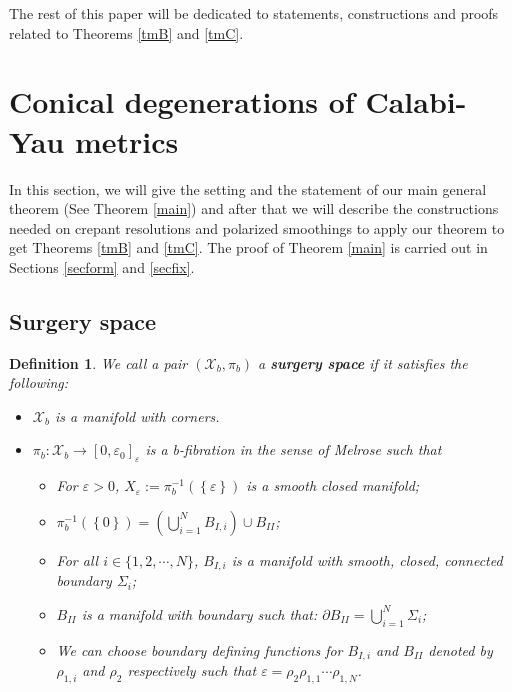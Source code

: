 \documentclass[a4paper,11pt]{article}
\newcounter{mythm}[section]
\newtheorem{defi}[mythm]{Definition}
\begin{document}
 The rest of this paper will be dedicated to statements, constructions and proofs related to Theorems \ref{tmB} and \ref{tmC}. 
 \section{Conical degenerations of Calabi-Yau metrics} \label{set}
 In this section, we will give the setting and the statement of our main general theorem (See Theorem \ref{main}) and after that we will describe the constructions needed on crepant resolutions and polarized smoothings to apply our theorem to get Theorems \ref{tmB} and \ref{tmC}. The proof of Theorem \ref{main} is carried out in Sections \ref{secform} and \ref{secfix}.
\subsection{Surgery space}
\begin{defi} \label{srg}
We call a pair $\left(\mathcal{X}_b, \pi_b \right)$ a \textbf{surgery space} if it satisfies the following: 
\begin{itemize}
    \item $\mathcal{X}_b$ is a manifold with corners.
    \item $\pi_b : \mathcal{X}_b \rightarrow [0, \varepsilon_0]_\varepsilon $ is a b-fibration in the sense of Melrose such that 
    \begin{itemize}
        \item For $\varepsilon >0$, $X_\varepsilon := \pi_b^{-1} (\left\{ \varepsilon \right\})$ is a smooth closed manifold;
        \item $\pi_b^{-1} (\left\{ 0 \right\}) = \left( \bigcup_{i=1}^N B_{I,i} \right) \cup B_{II}$;
        \item For all $i \in \{1,2, \cdots, N \}$, $B_{I,i}$ is a manifold with smooth, closed, connected boundary $\Sigma_i$;
        \item $B_{II}$ is a manifold with boundary such that: $\partial B_{II} = \bigcup_{i=1}^N \Sigma_i$;
        \item We can choose boundary defining functions for $B_{I,i}$ and $B_{II}$ denoted by $\rho_{1,i}$ and $\rho_{2}$ respectively such that $\varepsilon = \rho_2 \rho_{1,1} \cdots \rho_{1,N}$.
    \end{itemize}
\end{itemize}
\end{defi}
\vspace{0.5cm}
\end{document}
